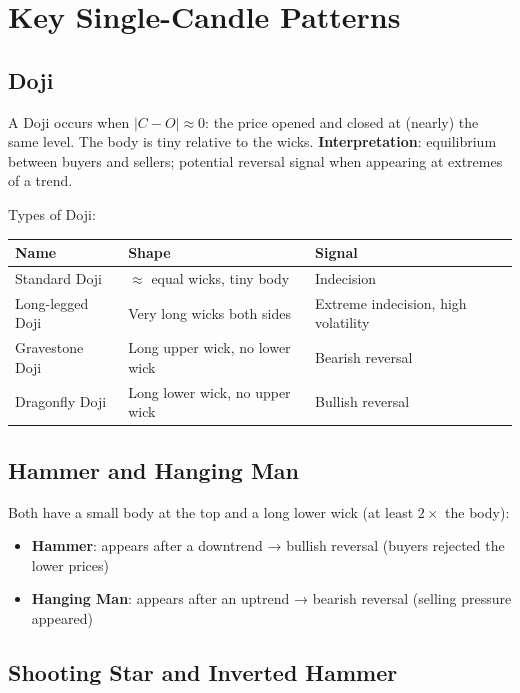 \documentclass[12pt,a4paper,openany]{report}
\theoremstyle{definition}
\begin{document}
\section{Key Single-Candle Patterns}

\subsection{Doji}

A Doji occurs when $|C - O| \approx 0$: the price opened and closed at (nearly) the same level. The body is tiny relative to the wicks. \textbf{Interpretation}: equilibrium between buyers and sellers; potential reversal signal when appearing at extremes of a trend.

Types of Doji:
\begin{center}
\begin{tabular}{lll}
\toprule
\textbf{Name} & \textbf{Shape} & \textbf{Signal} \\
\midrule
Standard Doji & $\approx$ equal wicks, tiny body & Indecision \\
Long-legged Doji & Very long wicks both sides & Extreme indecision, high volatility \\
Gravestone Doji & Long upper wick, no lower wick & Bearish reversal \\
Dragonfly Doji & Long lower wick, no upper wick & Bullish reversal \\
\bottomrule
\end{tabular}
\end{center}

\subsection{Hammer and Hanging Man}

Both have a small body at the top and a long lower wick (at least $2\times$ the body):
\begin{itemize}
  \item \textbf{Hammer}: appears after a downtrend → bullish reversal (buyers rejected the lower prices)
  \item \textbf{Hanging Man}: appears after an uptrend → bearish reversal (selling pressure appeared)
\end{itemize}

\subsection{Shooting Star and Inverted Hammer}
\end{document}
